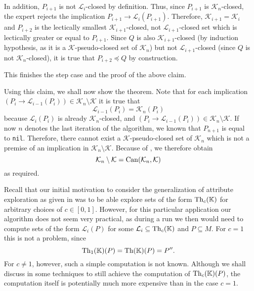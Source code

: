 \begin{Proof}
  In addition, $P_{i+1}$ is not $\mathcal{L}_{i}$-closed by definition.  Thus, since
  $P_{i+1}$ is $\mathcal{K}_{n}$-closed, the expert rejects the implication $P_{i+1} \to
  \mathcal{L}_{i}(P_{i+1})$.  Therefore, $\mathcal{K}_{i+1} = \mathcal{K}_{i}$ and
  $P_{i+2}$ is the lectically smallest $\mathcal{K}_{i+1}$-closed, not
  $\mathcal{L}_{i+1}$-closed set which is lectically greater or equal to $P_{i+1}$.  Since
  $Q$ is also $\mathcal{K}_{i+1}$-closed (by induction hypothesis, as it is a
  $\mathcal{K}$-pseudo-closed set of $\mathcal{K}_{n}$) but not $\mathcal{L}_{i+1}$-closed
  (since $Q$ is not $\mathcal{K}_{n}$-closed), it is true that $P_{i+2} \preceq Q$ by
  construction.

  This finishes the step case and the proof of the above claim.

  Using this claim, we shall now show the theorem.  Note that for each implication $(P_{i}
  \to \mathcal{L}_{i-1}(P_{i})) \in \mathcal{K}_{n} \setminus \mathcal{K}$ it is true that
  \begin{equation}
    \label{eq:38}
    \mathcal{L}_{i-1}(P_{i}) = \mathcal{K}_{n}(P_{i})
  \end{equation}
  because $\mathcal{L}_{i}(P_{i})$ is already $\mathcal{K}_{n}$-closed, and $(P_{i} \to
  \mathcal{L}_{i-1}(P_{i})) \in \mathcal{K}_{n} \setminus \mathcal{K}$.  If now $n$
  denotes the last iteration of the algorithm, we known that $P_{n+1}$ is equal to
  \lstinline{nil}.  Therefore, there cannot exist a $\mathcal{K}$-pseudo-closed set of
  $\mathcal{K}_{n}$ which is not a premise of an implication in $\mathcal{K}_{n} \setminus
  \mathcal{K}$.  Because of , we therefore obtain
  \begin{equation*}
    \mathcal{K}_{n} \setminus \mathcal{K} = \operatorname{Can}(\mathcal{K}_{n}, \mathcal{K})
  \end{equation*}
  as required.
\end{Proof}

Recall that our initial motivation to consider the generalization of attribute exploration
as given in  was to be able explore sets of the form
$\operatorname{Th}_{c}({\mathbb{K}})$ for arbitrary choices of $c \in [0,1]$.  However, for this particular
application our algorithm does not seem very practical, as during a run we then would need
to compute sets of the form $\mathcal{L}_{i}(P)$ for some $\mathcal{L}_{i} \subseteq
\operatorname{Th}_{c}({\mathbb{K}})$ and $P \subseteq M$.  For $c = 1$ this is not a problem, since
\begin{equation*}
  \operatorname{Th}_{1}({\mathbb{K}})(P) = \operatorname{Th}({\mathbb{K}})(P) = P''.
\end{equation*}
For $c \neq 1$, however, such a simple computation is not known.  Although we shall
discuss in  some techniques to still achieve the computation of
$\operatorname{Th}_{c}({\mathbb{K}})(P)$, the computation itself is potentially much more expensive than in
the case $c = 1$.

